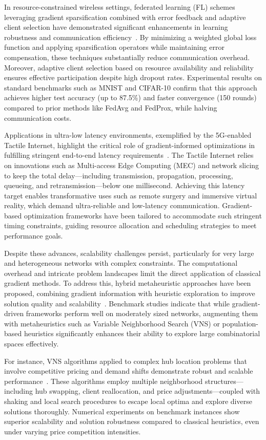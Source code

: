 \documentclass[sigconf]{acmart}
\begin{document}
In resource-constrained wireless settings, federated learning (FL) schemes leveraging gradient sparsification combined with error feedback and adaptive client selection have demonstrated significant enhancements in learning robustness and communication efficiency~\cite{ref4}. By minimizing a weighted global loss function and applying sparsification operators while maintaining error compensation, these techniques substantially reduce communication overhead. Moreover, adaptive client selection based on resource availability and reliability ensures effective participation despite high dropout rates. Experimental results on standard benchmarks such as MNIST and CIFAR-10 confirm that this approach achieves higher test accuracy (up to 87.5\%) and faster convergence (150 rounds) compared to prior methods like FedAvg and FedProx, while halving communication costs.

Applications in ultra-low latency environments, exemplified by the 5G-enabled Tactile Internet, highlight the critical role of gradient-informed optimizations in fulfilling stringent end-to-end latency requirements~\cite{ref10}. The Tactile Internet relies on innovations such as Multi-access Edge Computing (MEC) and network slicing to keep the total delay—including transmission, propagation, processing, queueing, and retransmission—below one millisecond. Achieving this latency target enables transformative uses such as remote surgery and immersive virtual reality, which demand ultra-reliable and low-latency communication. Gradient-based optimization frameworks have been tailored to accommodate such stringent timing constraints, guiding resource allocation and scheduling strategies to meet performance goals.

Despite these advances, scalability challenges persist, particularly for very large and heterogeneous networks with complex constraints. The computational overhead and intricate problem landscapes limit the direct application of classical gradient methods. To address this, hybrid metaheuristic approaches have been proposed, combining gradient information with heuristic exploration to improve solution quality and scalability~\cite{ref37}. Benchmark studies indicate that while gradient-driven frameworks perform well on moderately sized networks, augmenting them with metaheuristics such as Variable Neighborhood Search (VNS) or population-based heuristics significantly enhances their ability to explore large combinatorial spaces effectively.

For instance, VNS algorithms applied to complex hub location problems that involve competitive pricing and demand shifts demonstrate robust and scalable performance~\cite{ref37}. These algorithms employ multiple neighborhood structures—including hub swapping, client reallocation, and price adjustments—coupled with shaking and local search procedures to escape local optima and explore diverse solutions thoroughly. Numerical experiments on benchmark instances show superior scalability and solution robustness compared to classical heuristics, even under varying price competition intensities.
\end{document}

